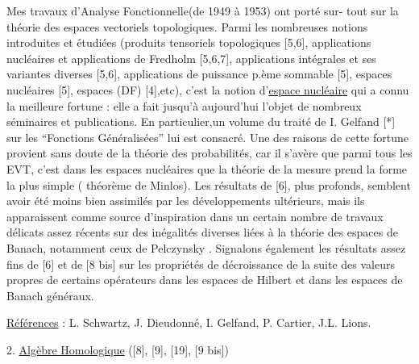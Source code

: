\documentclass[11pt]{article}
\newcommand{\scanpage}[1]{\par\bigskip\noindent{\small\sffamily[scan #1]}\par}
\newcommand{\mspage}[1]{{\small\sffamily[p.\,#1]}}
\newcommand{\hand}[1]{\textcolor{blue}{#1}}
\newcommand{\uline}[1]{\underline{#1}}
\begin{document}
Mes travaux d'Analyse Fonctionnelle(de 1949 à 1953) ont porté sur-%
tout sur la théorie des espaces vectoriels topologiques. Parmi les nombreuses
notions introduites et étudiées (produits tensoriels topologiques [5,6],
applications nucléaires et applications de Fredholm [5,6,7], applications
intégrales et ses variantes diverses [5,6], applications de puissance p.ème
sommable [5], espaces nucléaires [5], espaces (DF) [4],etc), c'est la notion
d'\uline{espace nucléaire} qui a connu la meilleure fortune : elle a fait jusqu'à
aujourd'hui l'objet de nombreux séminaires et publications. En particulier,un
volume du traité de I. Gelfand [*] sur les ``Fonctions Généralisées'' lui est
consacré. Une des raisons de cette fortune provient sans doute de la théorie
des probabilités, car il s'avère que parmi tous les EVT, c'est dans les espaces
nucléaires que la théorie de la mesure prend la forme la plus simple ( théorème
de Minlos). Les résultats de [6], plus profonds, semblent avoir été moins bien
assimilés par les développements ultérieurs, mais ils apparaissent comme source
d'inspiration dans un certain nombre de travaux délicats assez récents sur des
inégalités diverses liées à la théorie des espaces de Banach, notamment ceux
de Pelczynsky . \quad Signalons également les résultats assez fins de [6] et de
[8 bis] sur les propriétés de décroissance de la suite des valeurs propres de
certains opérateurs dans les espaces de Hilbert et dans les espaces de Banach
généraux.

\uline{Références} : L. Schwartz, J. Dieudonné, I. Gelfand, P. Cartier, J.L. Lions.

\mspage{\hand{196}}

\clearpage
\scanpage{119/197}
\mspage{- 2 -}

2. \uline{Algèbre Homologique} ([8], [9], [19], [9 bis])
\end{document}
